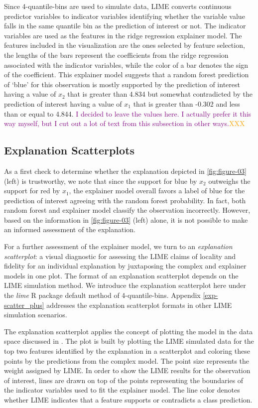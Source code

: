 \documentclass[AMS,STIX2COL]{WileyNJD-v2}\usepackage[]{graphicx}\usepackage[]{color}
\newcommand{\hh}[1]{\textcolor{orange}{#1}}
\newcommand{\kgc}[1]{\textcolor{purple}{#1}}
\begin{document}
Since 4-quantile-bins are used to simulate data, LIME converts continuous predictor variables to indicator variables identifying whether the variable value falls in the same quantile bin as the prediction of interest or not. The indicator variables are used as the features in the ridge regression explainer model. The features included in the visualization are the ones selected by feature selection, the lengths of the bars represent the coefficients from the ridge regression associated with the indicator variables, while the color of a bar denotes the sign of the coefficient. This explainer model suggests that a random forest prediction of `blue' for this observation is mostly supported by the prediction of interest having a value of $x_2$ that is greater than 4.834 but somewhat contradicted by the prediction of interest having a value of $x_1$ that is greater than -0.302 and less than or equal to 4.844. \kgc{I decided to leave the values here. I actually prefer it this way myself, but I cut out a lot of text from this subsection in other ways.}\hh{XXX }


\subsection{Explanation Scatterplots} \label{exp-scatter}

As a first check to determine whether the explanation depicted in \autoref{fig:figure-03} (left) is trustworthy, we note that since the support for blue by $x_2$ outweighs the support for red by $x_1$, the explainer model overall favors a label of blue for the prediction of interest agreeing with the random forest probability. In fact, both random forest and explainer model classify the observation incorrectly. However, based on the information in \autoref{fig:figure-03} (left) alone, it is not possible to make an informed assessment of the explanation. 

For a further assessment of the explainer model, we turn to an \emph{explanation scatterplot}: a visual diagnostic for assessing the LIME claims of locality and fidelity for an individual explanation by juxtaposing the complex and explainer models in one plot. The format of an explanation scatterplot depends on the LIME simulation method. We introduce the explanation scatterplot here under the \emph{lime} R package default method of 4-quantile-bins. Appendix \ref{exp-scatter_plus} addresses the explanation scatterplot formats in other LIME simulation scenarios.

The explanation scatterplot applies the concept of plotting the model in the data space discussed in \citet{wickham:2015}. The plot is built by plotting the LIME simulated data for the top two features identified by the explanation in a scatterplot and coloring these points by the predictions from the complex model. The point size represents the weight assigned by LIME. In order to show the LIME results for the observation of interest, lines are drawn on top of the points  representing the boundaries of the indicator variables used to fit the explainer model. The line color  denotes whether LIME indicates that a feature supports or contradicts a class prediction. 
\end{document}
